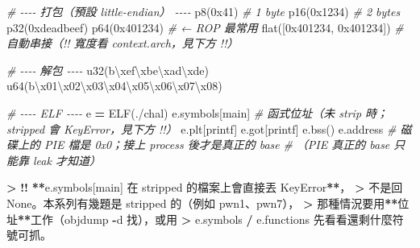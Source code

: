 \documentclass[10pt,a4paper]{article}
\newenvironment{Shaded}{\begin{snugshade}}{\end{snugshade}}
\newcommand{\BaseNTok}[1]{\textcolor[rgb]{0.00,0.00,0.81}{#1}}
\newcommand{\CharTok}[1]{\textcolor[rgb]{0.31,0.60,0.02}{#1}}
\newcommand{\CommentTok}[1]{\textcolor[rgb]{0.56,0.35,0.01}{\textit{#1}}}
\newcommand{\NormalTok}[1]{#1}
\newcommand{\OperatorTok}[1]{\textcolor[rgb]{0.81,0.36,0.00}{\textbf{#1}}}
\newcommand{\StringTok}[1]{\textcolor[rgb]{0.31,0.60,0.02}{#1}}
\renewenvironment{Shaded}{%
  \def\FrameCommand{\fboxsep=3.2pt\colorbox{shadecolor}}%
  \MakeFramed{\advance\hsize-\width\FrameRestore\small}%
}{%
  \endMakeFramed
}
\begin{document}
\begin{Shaded}
\begin{Highlighting}[]
\CommentTok{\# {-}{-}{-}{-} 打包（預設 little{-}endian） {-}{-}{-}{-}}
\NormalTok{p8(}\BaseNTok{0x41}\NormalTok{)      }\CommentTok{\# 1 byte}
\NormalTok{p16(}\BaseNTok{0x1234}\NormalTok{)   }\CommentTok{\# 2 bytes}
\NormalTok{p32(}\BaseNTok{0xdeadbeef}\NormalTok{)}
\NormalTok{p64(}\BaseNTok{0x401234}\NormalTok{)              }\CommentTok{\# ← ROP 最常用}
\NormalTok{flat([}\BaseNTok{0x401234}\NormalTok{, }\BaseNTok{0x401234}\NormalTok{]) }\CommentTok{\# 自動串接（!! 寬度看 context.arch，見下方 !!）}

\CommentTok{\# {-}{-}{-}{-} 解包 {-}{-}{-}{-}}
\NormalTok{u32(}\StringTok{b\textquotesingle{}}\CharTok{\textbackslash{}xef\textbackslash{}xbe\textbackslash{}xad\textbackslash{}xde}\StringTok{\textquotesingle{}}\NormalTok{)}
\NormalTok{u64(}\StringTok{b\textquotesingle{}}\CharTok{\textbackslash{}x01\textbackslash{}x02\textbackslash{}x03\textbackslash{}x04\textbackslash{}x05\textbackslash{}x06\textbackslash{}x07\textbackslash{}x08}\StringTok{\textquotesingle{}}\NormalTok{)}

\CommentTok{\# {-}{-}{-}{-} ELF {-}{-}{-}{-}}
\NormalTok{e }\OperatorTok{=}\NormalTok{ ELF(}\StringTok{\textquotesingle{}./chal\textquotesingle{}}\NormalTok{)}
\NormalTok{e.symbols[}\StringTok{\textquotesingle{}main\textquotesingle{}}\NormalTok{]          }\CommentTok{\# 函式位址（未 strip 時；stripped 會 KeyError，見下方 !!）}
\NormalTok{e.plt[}\StringTok{\textquotesingle{}printf\textquotesingle{}}\NormalTok{]}
\NormalTok{e.got[}\StringTok{\textquotesingle{}printf\textquotesingle{}}\NormalTok{]}
\NormalTok{e.bss()}
\NormalTok{e.address                  }\CommentTok{\# 磁碟上的 PIE 檔是 0x0；接上 process 後才是真正的 base}
                           \CommentTok{\# （PIE 真正的 base 只能靠 leak 才知道）}

\OperatorTok{\textgreater{}} \OperatorTok{!!} \OperatorTok{**}\NormalTok{\textasciigrave{}e.symbols[}\StringTok{\textquotesingle{}main\textquotesingle{}}\NormalTok{]\textasciigrave{} 在 stripped 的檔案上會直接丟 \textasciigrave{}KeyError\textasciigrave{}}\OperatorTok{**}\NormalTok{，}
\OperatorTok{\textgreater{}}\NormalTok{ 不是回 \textasciigrave{}None\textasciigrave{}。本系列有幾題是 stripped 的（例如 pwn1、pwn7），}
\OperatorTok{\textgreater{}}\NormalTok{ 那種情況要用}\OperatorTok{**}\NormalTok{位址}\OperatorTok{**}\NormalTok{工作（\textasciigrave{}objdump }\OperatorTok{{-}}\NormalTok{d\textasciigrave{} 找），或用}
\OperatorTok{\textgreater{}}\NormalTok{ \textasciigrave{}e.symbols\textasciigrave{} }\OperatorTok{/}\NormalTok{ \textasciigrave{}e.functions\textasciigrave{} 先看看還剩什麼符號可抓。}


\end{Highlighting}
\end{Shaded}
\end{document}
